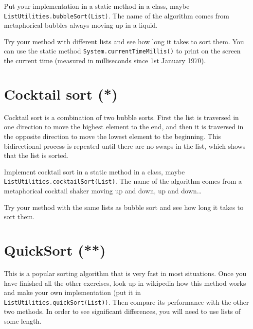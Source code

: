 \documentclass{article}
\begin{document}
Put your implementation in a static method in a class, maybe
\verb+ListUtilities.bubbleSort(List)+. The name of the algorithm comes
from metaphorical bubbles always moving up in a liquid. 

Try your method with different lists and see how long it takes to sort
them. You can use the static method \verb+System.currentTimeMillis()+
to print on the screen the current time (measured in milliseconds
since 1st January 1970). 

\section{Cocktail sort (*)}
\label{sec:cocktail-sort}

Cocktail sort is a combination of two bubble sorts. First the list is
traversed in one direction to move the highest element to the end, and
then it is traversed in the opposite direction to move the lowest
element to the beginning. This bidirectional process is repeated until
there are no swaps in the list, which shows that the list is sorted. 

Implement cocktail sort in a static method in a class, maybe
\verb+ListUtilities.cocktailSort(List)+. The name of the algorithm comes
from a metaphorical cocktail shaker moving up and down, up and
down\ldots 

Try your method with the same lists as bubble sort 
and see how long it takes to sort them. 

\section{QuickSort (**)}
\label{sec:quicksort-}

This is a popular sorting algorithm that is very fast in most
situations. Once you have finished all the other exercises, look up in
wikipedia how this method works and make your own implementation (put
it in \verb+ListUtilities.quickSort(List))+. Then compare its
performance with the other two methods. In order to see significant
differences, you will need to use lists of some length. 
\end{document}
